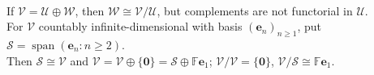 \begin{perspective} \label{per:quotients-and-complements-are-not-functorial-warnings} \\
If $\mathcal{V}=\mathcal{U}\oplus\mathcal{W}$, then $\mathcal{W}\cong\mathcal{V}/\mathcal{U}$, but complements are not functorial in $\mathcal{U}$.\\
For $\mathcal{V}$ countably infinite-dimensional with basis $(\mathbf{e}_n)_{n\geq1}$, put $\mathcal{S}=\operatorname{span}(\mathbf{e}_n:n\geq2)$.\\
Then $\mathcal{S}\cong\mathcal{V}$ and $\mathcal{V}=\mathcal{V}\oplus\{\mathbf{0}\} =\mathcal{S}\oplus\mathbb{F}\mathbf{e}_1$; $\mathcal{V}/\mathcal{V}=\{\mathbf{0}\}$, $\mathcal{V}/\mathcal{S}\cong\mathbb{F}\mathbf{e}_1$.
\end{perspective}
